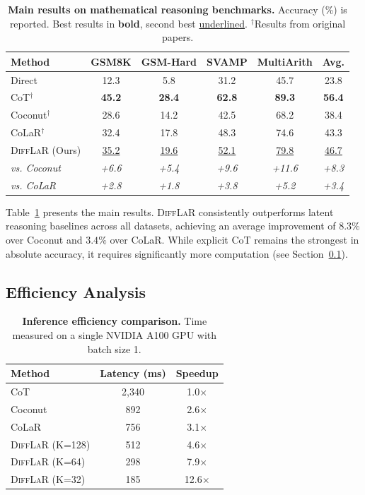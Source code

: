 \documentclass{article}
\newcommand{\difflar}{\textsc{DiffLaR}}
\begin{document}
\begin{table}[t]
\centering
\caption{\textbf{Main results on mathematical reasoning benchmarks.} Accuracy (\%) is reported. Best results in \textbf{bold}, second best \underline{underlined}. $^\dagger$Results from original papers.}
\label{tab:main}
\begin{tabular}{lccccc}
\toprule
\textbf{Method} & \textbf{GSM8K} & \textbf{GSM-Hard} & \textbf{SVAMP} & \textbf{MultiArith} & \textbf{Avg.} \\
\midrule
Direct & 12.3 & 5.8 & 31.2 & 45.7 & 23.8 \\
CoT$^\dagger$ & \textbf{45.2} & \textbf{28.4} & \textbf{62.8} & \textbf{89.3} & \textbf{56.4} \\
\midrule
Coconut$^\dagger$ & 28.6 & 14.2 & 42.5 & 68.2 & 38.4 \\
CoLaR$^\dagger$ & 32.4 & 17.8 & 48.3 & 74.6 & 43.3 \\
\difflar{} (Ours) & \underline{35.2} & \underline{19.6} & \underline{52.1} & \underline{79.8} & \underline{46.7} \\
\midrule
\rowcolor{gray!10}
\textit{vs. Coconut} & \textit{+6.6} & \textit{+5.4} & \textit{+9.6} & \textit{+11.6} & \textit{+8.3} \\
\rowcolor{gray!10}
\textit{vs. CoLaR} & \textit{+2.8} & \textit{+1.8} & \textit{+3.8} & \textit{+5.2} & \textit{+3.4} \\
\bottomrule
\end{tabular}
\end{table}

Table~\ref{tab:main} presents the main results. \difflar{} consistently outperforms latent reasoning baselines across all datasets, achieving an average improvement of $8.3\%$ over Coconut and $3.4\%$ over CoLaR. While explicit CoT remains the strongest in absolute accuracy, it requires significantly more computation (see Section~\ref{sec:efficiency}).

\subsection{Efficiency Analysis}
\label{sec:efficiency}

\begin{table}[t]
\centering
\caption{\textbf{Inference efficiency comparison.} Time measured on a single NVIDIA A100 GPU with batch size 1.}
\label{tab:efficiency}
\begin{tabular}{lcc}
\toprule
\textbf{Method} & \textbf{Latency (ms)} & \textbf{Speedup} \\
\midrule
CoT & 2,340 & 1.0$\times$ \\
Coconut & 892 & 2.6$\times$ \\
CoLaR & 756 & 3.1$\times$ \\
\difflar{} (K=128) & 512 & 4.6$\times$ \\
\difflar{} (K=64) & 298 & 7.9$\times$ \\
\difflar{} (K=32) & 185 & 12.6$\times$ \\
\bottomrule
\end{tabular}
\end{table}
\end{document}
